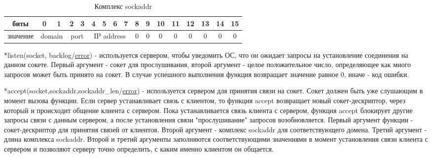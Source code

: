 \documentclass[12t]{article}
\begin{document}
\begin{table}[H]
\caption{\label{sockaddr}Комплекс sockaddr}
\begin{center}
\begin{tabular}{|c|c|c|c|c|c|c|c|c|c|c|c|c|c|c|c|c|}
\hline
биты & 0 & 1 & 2 & 3 & 4 & 5 & 6 & 7 & 8 & 9 & 10 & 11 & 12 & 13 & 14 & 15 \\
\hline
значение & \multicolumn{2}{|c|}{domain} & \multicolumn{2}{|c|}{port} & \multicolumn{4}{|c|}{IP address} & 0 & 0 & 0 & 0 & 0 & 0 & 0 & 0 \\
\hline
\end{tabular}
\end{center}
\end{table}

\label{listen}
*listen(socket, backlog/\hyperref[error]{error}) - используется сервером, чтобы уведомить ОС, что он ожидает запросы на установление соединения на данном сокете. Первый аргумент - сокет для прослушивания, второй аргумент - целое положительное число, определяющее как много запросов может быть принято на сокет. В случае успешного выполнения функция возвращает значение равное 0, иначе - код ошибки.

\label{accept}
*accept(socket,sockaddr,sockaddr\_len/\hyperref[error]{error}) - используется сервером для принятия связи на сокет. Сокет должен быть уже слушающим в момент вызова функции. Если сервер устанавливает связь с клиентом, то функция accept возвращает новый сокет-дескриптор, через который и происходит общение клиента с сервером. Пока устанавливается связь клиента с сервером, функция accept блокирует другие запросы связи с данным сервером, а после установления связи "прослушивание" запросов возобновляется. Первый аргумент функции - сокет-дескриптор для принятия связей от клиентов. Второй аргумент - комплекс sockaddr для соответствующего домена. Третий аргумент - длина комплекса sockaddr. Второй и третий аргументы заполняются соответствующими значениями в момент установления связи клиента с сервером и позволяют серверу точно определить, с каким именно клиентом он общается.
\end{document}
